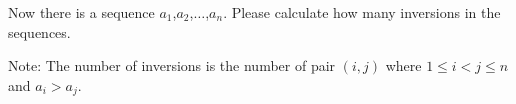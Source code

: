 Now there is a sequence $a_{1}$,$a_{2}$,$\ldots$,$a_{n}$. Please calculate how many inversions in the sequences.

Note: The number of inversions is the number of pair $(i,j)$ where $1 \leq i < j \leq n$ and $a_{i} > a_{j}$.
